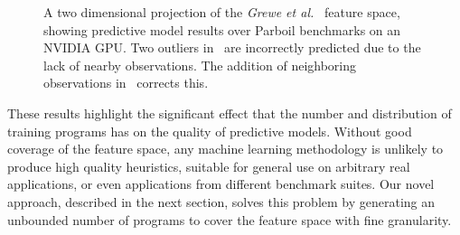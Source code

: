 \begin{figure}
  \caption{A two dimensional projection of the \emph{Grewe et al.\ } feature space, showing predictive model results over Parboil benchmarks on an NVIDIA GPU. Two outliers in~\protect{} are incorrectly predicted due to the lack of nearby observations. The addition of neighboring observations in~\protect{} corrects this.}%
  \label{fig:pca-benchmarks}
\end{figure}

These results highlight the significant effect that the number and distribution of training programs has on the quality of predictive models. Without good coverage of the feature space, any machine learning methodology is unlikely to produce high quality heuristics, suitable for general use on arbitrary real applications, or even applications from different benchmark suites. Our novel approach, described in the next section, solves this problem by generating an unbounded number of programs to cover the feature space with fine granularity.